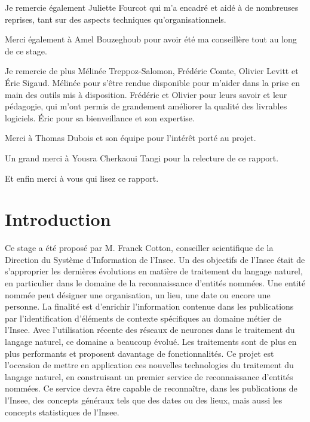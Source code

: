 \documentclass[11pt, oneside, a4paper, titlepage, french]{article}
\begin{document}
Je remercie également Juliette Fourcot qui m'a encadré et aidé à de nombreuses reprises, tant sur des aspects techniques qu'organisationnels.
\newline

Merci également à Amel Bouzeghoub pour avoir été ma conseillère tout au long de ce stage.
\newline

Je remercie de plus Mélinée Treppoz-Salomon, Frédéric Comte, Olivier Levitt et Éric Sigaud. Mélinée pour s'être rendue disponible pour m'aider dans la prise en main des outils mis à disposition. Frédéric et Olivier pour leurs savoir et leur pédagogie, qui m'ont permis de grandement améliorer la qualité des livrables logiciels. Éric pour sa bienveillance et son expertise.
\newline

Merci à Thomas Dubois et son équipe pour l'intérêt porté au projet.
\newline

Un grand merci à Yousra Cherkaoui Tangi pour la relecture de ce rapport.
\newline

Et enfin merci à vous qui lisez ce rapport.
\newpage

\tableofcontents
\newpage


\section*{Introduction}
Ce stage a été proposé par M. Franck Cotton, conseiller scientifique de la Direction du Système d'Information de l'Insee. Un des objectifs de l'Insee était de s'approprier les dernières évolutions en matière de traitement du langage naturel, en particulier dans le domaine de la reconnaissance d'entités nommées. Une entité nommée peut désigner une organisation, un lieu, une date ou encore une personne. La finalité est d'enrichir l'information contenue dans les publications par l'identification d'éléments de contexte spécifiques au domaine métier de l'Insee. Avec l'utilisation récente des réseaux de neurones dans le traitement du langage naturel, ce domaine a beaucoup évolué. Les traitements sont de plus en plus performants et proposent davantage de fonctionnalités. Ce projet est l'occasion de mettre en application ces nouvelles technologies du traitement du langage naturel, en construisant un premier service de reconnaissance d'entités nommées. Ce service devra être capable de reconnaître, dans les publications de l'Insee, des concepts généraux tels que des dates ou des lieux, mais aussi les concepts statistiques de l'Insee.
\newline
\end{document}
